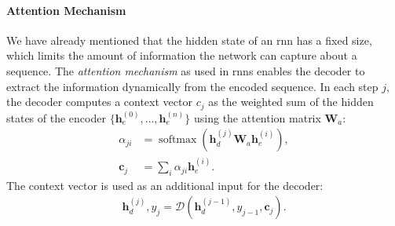 \paragraph{Attention Mechanism} We have already mentioned that the hidden state of an \ac{rnn} has a fixed size, which limits the amount of information the network can capture about a sequence. The \emph{attention mechanism} \cite{bahdanau2015neural} as used in \acp{rnn} enables the decoder to extract the information dynamically from the encoded sequence. In each step $j$, the decoder computes a context vector $c_j$ as the weighted sum of the hidden states of the encoder $\{\mathbf{h}_e^{(0)}, \ldots, \mathbf{h}_e^{(n)}\}$ using the attention matrix $\mathbf{W}_a$:
\begin{align}
    \alpha_{ji}  & = \operatorname{softmax}(\mathbf{h}_d^{(j)}\mathbf{W}_a \mathbf{h}_e^{(i)}), \\
    \mathbf{c}_j & = \sum_i \alpha_{ji} \mathbf{h}_e^{(i)}.
\end{align}
The context vector is used as an additional input for the decoder:
\begin{align}
    \mathbf{h}_d^{(j)}, y_j = \mathcal{D}(\mathbf{h}_d^{(j-1)}, y_{j-1}, \mathbf{c}_j).
\end{align}


